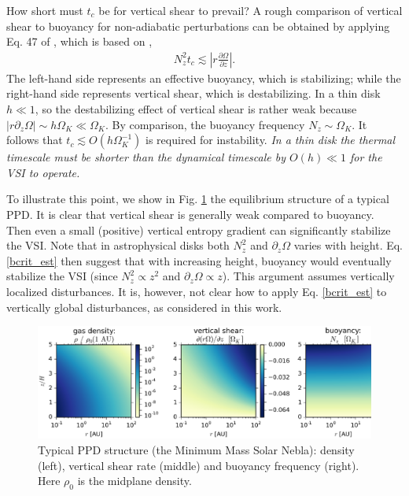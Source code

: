 \documentclass[iop]{emulateapj}
\newcommand{\p}{\partial}
\begin{document}
How short must $t_c$ be for vertical shear to prevail? A rough 
comparison of vertical shear to buoyancy for non-adiabatic
perturbations can be obtained by applying Eq. 47 of \cite{urpin03}, which is based on 
\cite{townsend58},   
\begin{align}\label{bcrit_est}
  N_z^2 t_c \lesssim \left|r\frac{\p\Omega}{\p z}\right|. 
\end{align}
The left-hand side represents an effective buoyancy, which is
stabilizing; while the right-hand side represents vertical shear,
which is destabilizing. In a thin disk $ h \ll 1$, so the destabilizing effect of 
vertical shear is rather weak because $|r\p_z\Omega|\sim h\Omega_K
\ll \Omega_K$. By comparison, the buoyancy frequency $N_z\sim
\Omega_K$. It follows that $t_c\lesssim O( h\Omega_K^{-1})$ is
required for instability.  \emph{In a thin  
  disk the thermal timescale must be shorter than the dynamical
  timescale by $O( h)\ll 1$ for the VSI to operate.}   


To illustrate this point, we show in Fig. \ref{eqm_structure} the
equilibrium structure of a typical PPD. %
It is
clear that vertical shear is 
generally weak compared to buoyancy. Then even a small (positive)
vertical entropy gradient can significantly stabilize the VSI. 
Note that in astrophysical disks both $N_z^2$ and $\p_z\Omega$ varies
with height. Eq. \ref{bcrit_est} then suggest that with
increasing height, buoyancy would eventually stabilize the VSI (since
$N_z^2\propto z^2$ and $\p_z\Omega\propto z$).
This argument assumes vertically localized disturbances. It is,
however, not clear how to apply Eq. \ref{bcrit_est} to vertically
global disturbances, as considered in this work.

\begin{figure}
  \includegraphics[width=\linewidth]{figures/rhoshearNz}
  \caption{Typical PPD structure (the Minimum Mass
    Solar Nebla): density (left), vertical shear rate (middle) and
    buoyancy frequency (right). Here $\rho_0$ is the midplane density.  
    \label{eqm_structure} 
  }
\end{figure}
\end{document}

